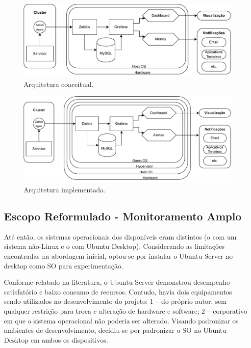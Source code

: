 \begin{figure}[H]
\centering
\setlength{\abovecaptionskip}{-20pt}
\includegraphics[width=\textwidth]{Imagens/chap03/v0_diagram.pdf}
\caption{Arquitetura conceitual.}
\label{fig:ArquiteturaConceitual}
\end{figure}

\begin{figure}[H]
\centering
\setlength{\abovecaptionskip}{-20pt}
\includegraphics[width=\textwidth]{Imagens/chap03/v1_diagram.pdf}
\caption{Arquitetura implementada.}
\label{fig:ArquiteturaImplementada}
\end{figure}

\subsection{Escopo Reformulado - Monitoramento Amplo}
\label{subsection:EscopoReformulado}

Até então, os sistemas operacionais dos  disponíveis eram distintos (o  com um sistema não-Linux e o  com Ubuntu Desktop). Considerando as limitações encontradas na abordagem inicial, optou-se por instalar o Ubuntu Server no desktop como SO para experimentação.

Conforme relatado na literatura, o Ubuntu Server demonstrou desempenho satisfatório e baixo consumo de recursos. Contudo, havia dois equipamentos sendo utilizados no desenvolvimento do projeto: 1 --  do próprio autor, sem qualquer restrição para troca e alteração de hardware e software; 2 --  corporativo em que o sistema operacional não poderia ser alterado. Visando padronizar os ambientes de desenvolvimento, decidiu-se por padronizar o SO no Ubuntu Desktop em ambos os dispositivos.

